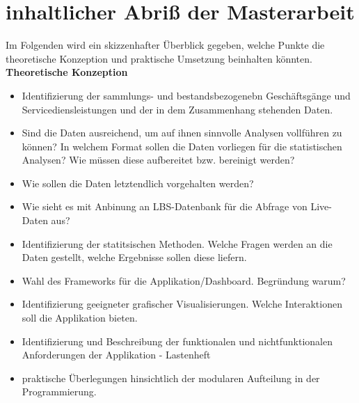 \documentclass[10pt,a4paper,twocolumn,conference]{IEEEtran}
\begin{document}



\section{inhaltlicher Abriß der Masterarbeit}
Im Folgenden wird ein skizzenhafter Überblick gegeben, welche Punkte die
theoretische Konzeption und praktische Umsetzung beinhalten könnten.\\ 

\textbf{Theoretische Konzeption}\\
\begin{itemize}
    \item Identifizierung der sammlungs- und bestandsbezogenebn Geschäftsgänge und Servicediensleistungen und der in dem Zusammenhang stehenden Daten.
    \item Sind die Daten ausreichend, um auf ihnen sinnvolle Analysen vollführen zu
          können? In welchem Format sollen die Daten vorliegen für die statistischen
          Analysen? Wie müssen diese aufbereitet bzw. bereinigt werden?
    \item Wie sollen die Daten letztendlich vorgehalten werden?
    \item Wie sieht es mit Anbinung an LBS-Datenbank für die Abfrage von Live-Daten
          aus?
    \item Identifizierung der statitsischen Methoden. Welche Fragen werden an die Daten
          gestellt, welche Ergebnisse sollen diese liefern.
    \item Wahl des Frameworks für die Applikation/Dashboard. Begründung warum?
    \item Identifizierung geeigneter grafischer Visualisierungen. Welche
          Interaktionen soll die Applikation bieten.
    \item Identifizierung und Beschreibung der funktionalen und nichtfunktionalen
          Anforderungen der Applikation - Lastenheft
    \item praktische Überlegungen hinsichtlich der modularen Aufteilung in der
          Programmierung.\\
\end{itemize}
\end{document}
